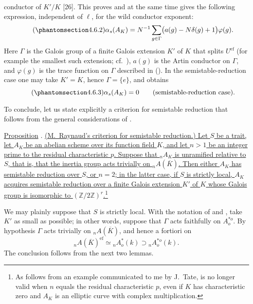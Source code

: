 conductor of $K'/K$ [26].  This proves  and at the same time gives the
following expression, independent of $\ell$, for the wild conductor
exponent:
\begin{equation}\tag{\SGARefTarget{sga7.sga7i.eix.n4-6-2}{4.6.2}}
 \alpha_s(A_K)
 =N^{-1}\sum_{g\in\Gamma}
   \bigl(a(g)-N\delta(g)+1\bigr)\varphi(g).
\end{equation}
Here $\Gamma$ is the Galois group of a finite Galois extension $K'$ of
$K$ that splits $U^{\mathrm{ef}}$ (for example the smallest such
extension; cf.\ ), $a(g)$ is the Artin conductor on $\Gamma$, and
$\varphi(g)$ is the trace function on $\Gamma$ described in ().
In the semistable-reduction case one may take $K'=K$, hence
$\Gamma=\{e\}$, and obtains
\begin{equation}\tag{\SGARefTarget{sga7.sga7i.eix.n4-6-3}{4.6.3}}
 \alpha_s(A_K)=0
 \qquad\text{(semistable-reduction case).}
\end{equation}

To conclude, let us state explicitly a criterion for semistable
reduction that follows from the general considerations of .

\medskip
\noindent
\underline{Proposition} . \underline{(M.\ Raynaud's criterion for
semistable reduction.)  Let $S$ be a trait, let $A_K$ be an abelian
scheme over its function field $K$, and let $n>1$ be an integer prime
to the residual characteristic $p$.  Suppose that ${}_nA_K$ is
unramified relative to $S$, that is, that the inertia group acts
trivially on ${}_nA(\overline K)$.  Then either $A_K$ has semistable
reduction over $S$, or $n=2$; in the latter case, if $S$ is strictly
local, $A_K$ acquires semistable reduction over a finite Galois extension
$K'$ of $K$ whose Galois group is isomorphic to
$(\mathbb Z/2\mathbb Z)^r$.}\footnote{As follows from an example
communicated to me by J.\ Tate,  is no longer valid when $n$ equals
the residual characteristic $p$, even if $K$ has characteristic zero
and $A_K$ is an elliptic curve with complex multiplication.}

We may plainly suppose that $S$ is strictly local.  With the notation
of  and , take $K'$ as small as possible; in other words, suppose
that $\Gamma$ acts faithfully on $A^{*o}_o$.  By hypothesis $\Gamma$
acts trivially on ${}_nA(\overline K)$, and hence a fortiori on
\[
 {}_nA(\overline K)^{\mathrm{ef}}
 \simeq{}_nA^*_o(k)\supset{}_nA^{*o}_o(k).
\]
The conclusion follows from the next two lemmas.

